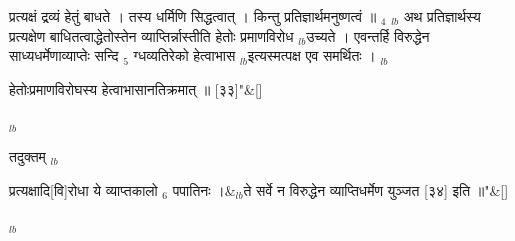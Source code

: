 \documentclass[article,12pt,a4paper]{memoir}%
\newcounter{parCount}
\begin{document}
प्रत्यक्षं द्रव्यं हेतुं बाधते । तस्य धर्मिणि सिद्धत्वात् । किन्तु प्रतिज्ञार्थमनुष्णत्वं ॥ {\tiny $_{4}$} {\tiny $_{lb}$} अथ प्रतिज्ञार्थस्य प्रत्यक्षेण बाधितत्वाद्धेतोस्तेन व्याप्तिर्न्नास्तीति हेतोः प्रमाणविरोध {\tiny $_{lb}$}उच्यते । एवन्तर्हि विरुद्धेन साध्यधर्मेणाव्याप्तेः सन्दि {\tiny $_{5}$} ग्धव्यतिरेको हेत्वाभास {\tiny $_{lb}$}इत्यस्मत्पक्ष एव समर्थितः ।
	{}
	\pend%
      {\tiny $_{lb}$}
	  \bigskip
	  \begingroup
	
	    
	    \stanza[\smallbreak]
	  हेतोःप्रमाणविरोघस्य हेत्वाभासानतिक्रमात् ॥ [३३]{\normalfontlatin\large\qquad{}"}\&[\smallbreak]
	  
	  
	  
	  \endgroup
	{\tiny $_{lb}$}

	  
	  \pstart \leavevmode%
	तदुक्तम्
	{}
	\pend%
      {\tiny $_{lb}$}
	  \bigskip
	  \begingroup
	
	    
	    \stanza[\smallbreak]
	  प्रत्यक्षादि[वि]रोधा ये व्याप्तकालो {\tiny $_{6}$} पपातिनः ।&{\tiny $_{lb}$}ते सर्वे न विरुद्धेन व्याप्तिधर्मेण युञ्जत [३४] इति ॥{\normalfontlatin\large\qquad{}"}\&[\smallbreak]
	  
	  
	  
	  \endgroup
	{\tiny $_{lb}$}
\end{document}
